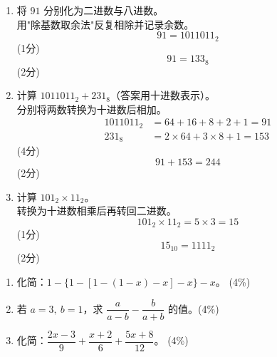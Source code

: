 \documentclass[12pt,a4paper]{exam-zh}
\begin{document}
\begin{solution}
    \begin{enumerate}[label=(\alph*)]
        \item 将 $91$ 分别化为二进数与八进数。 \\
        用"除基数取余法"反复相除并记录余数。
        \[
            91 = 1011011_2
        \]
        \hfill (1分)
        \[
            91 = 133_8
        \]
        \hfill (2分)

        \item 计算 $1011011_2+231_8$（答案用十进数表示）。 \\
        分别将两数转换为十进数后相加。
        \begin{align*}
            1011011_2 &= 64+16+8+2+1 = 91 \\
            231_8 &= 2\times64+3\times8+1 = 153
        \end{align*}
        \hfill (4分)
        \[
            91+153 = 244
        \]
        \hfill (2分)

        \item 计算 $101_2 \times 11_2$。 \\
        转换为十进数相乘后再转回二进数。
        \[
            101_2 \times 11_2 = 5 \times 3 = 15
        \]
        \hfill (1分)
        \[
            15_{10} = 1111_2
        \]
        \hfill (2分)
    \end{enumerate}
\end{solution}


\begin{question}[points = 12]
    \begin{enumerate}[label=(\alph*)]
        \item 化简：$1-\{1-[1-(1-x)-x]-x\}-x$。 \hfill (4\%)
        \item 若 $a=3,\ b=1$，求 $\dfrac{a}{a-b} - \dfrac{b}{a+b}$ 的值。\hfill (4\%)
        \item 化简：$\dfrac{2x-3}{9} + \dfrac{x+2}{6} + \dfrac{5x+8}{12}$。 \hfill (4\%)
    \end{enumerate}
\end{question}
\end{document}
